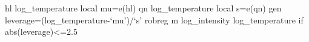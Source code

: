 hl log_temperature
local mu=e(hl)
qn log_temperature
local s=e(qn)
gen leverage=(log_temperature-`mu')/`s'
robreg m log_intensity log_temperature if abs(leverage)<=2.5
